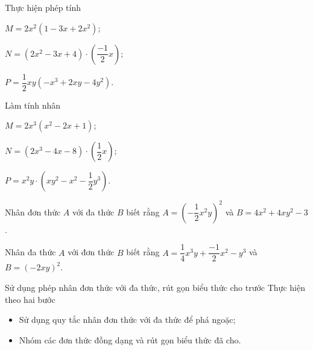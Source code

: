 \begin{vd}%
Thực hiện phép tính
\begin{listEX}[2]
	\item $M=2x^2(1-3x+2x^2)$;
	\item $N=(2x^2-3x+4)\cdot\left(\dfrac{-1}{2}x\right)$;
	\item $P=\dfrac{1}{2}xy(-x^3+2xy-4y^2)$.
\end{listEX}
\end{vd}
\begin{vd}%
Làm tính nhân
\begin{listEX}[2]
    \item $M=2x^3(x^2-2x+1)$;
    \item $N=(2x^3-4x-8)\cdot\left(\dfrac{1}{2}x\right)$;
    \item $P=x^2y\cdot\left(xy^2-x^2-\dfrac{1}{2}y^3\right)$.
\end{listEX}
\end{vd}
\begin{vd}%
    Nhân đơn thức $A$ với đa thức $B$ biết rằng $A=\left(-\dfrac{1}{2}x^2y\right)^2$ và $B=4x^2+4xy^2-3$.
\end{vd}
\begin{vd}%
    Nhân đa thức $A$ với đơn thức $B$ biết rằng $A=\dfrac{1}{4}x^3y+\dfrac{-1}{2}x^2-y^3$ và $B=(-2xy)^2$.
\end{vd}

\begin{dang}{Sử dụng phép nhân đơn thức với đa thức, rút gọn biểu thức cho trước}
	Thực hiện theo hai bước
	\begin{itemize}
	\item Sử dụng quy tắc nhân đơn thức với đa thức để phá ngoặc;
	\item Nhóm các đơn thức đồng dạng và rút gọn biểu thức đã cho.
	\end{itemize}
\end{dang}

